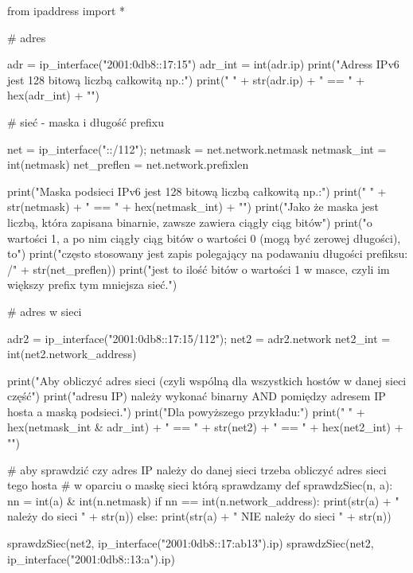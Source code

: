 \label{czy_w_sieci_kod}\begin{CodeFrame*}[python][fontsize=\footnotesize]{}
from ipaddress import *

# adres

adr     = ip_interface("2001:0db8::17:15")
adr_int = int(adr.ip)
print("Adress IPv6 jest 128 bitową liczbą całkowitą np.:")
print("  " + str(adr.ip) + " == " + hex(adr_int) + "\n")

# sieć - maska i długość prefixu

net         = ip_interface("::/112");
netmask     = net.network.netmask
netmask_int = int(netmask)
net_preflen = net.network.prefixlen

print("Maska podsieci IPv6 jest 128 bitową liczbą całkowitą np.:")
print("  " + str(netmask) + " == " + hex(netmask_int) + "\n")
print("Jako że maska jest liczbą, która zapisana binarnie, zawsze zawiera ciągły ciąg bitów")
print("o wartości 1, a po nim ciągły ciąg bitów o wartości 0 (mogą być zerowej długości), to")
print("często stosowany jest zapis polegający na podawaniu długości prefiksu: /" + str(net_preflen))
print("jest to ilość bitów o wartości 1 w masce, czyli im większy prefix tym mniejsza sieć.\n")

# adres w sieci

adr2     = ip_interface("2001:0db8::17:15/112");
net2     = adr2.network
net2_int = int(net2.network_address)

print("Aby obliczyć adres sieci (czyli wspólną dla wszystkich hostów w danej sieci część")
print("adresu IP) należy wykonać binarny AND pomiędzy adresem IP hosta a maską podsieci.")
print("Dla powyższego przykładu:")
print("  " + hex(netmask_int & adr_int) + " == " + str(net2) + " == " + hex(net2_int) + "\n")

# aby sprawdzić czy adres IP należy do danej sieci trzeba obliczyć adres sieci tego hosta
# w oparciu o maskę sieci którą sprawdzamy
def sprawdzSiec(n, a):
	nn = int(a) & int(n.netmask)
	if nn == int(n.network_address):
		print(str(a) + " należy do sieci " + str(n))
	else:
		print(str(a) + " NIE należy do sieci " + str(n))

sprawdzSiec(net2, ip_interface("2001:0db8::17:ab13").ip)
sprawdzSiec(net2, ip_interface("2001:0db8::13:a").ip)
\end{CodeFrame*}

\setcounter{subsubsection}{0}
